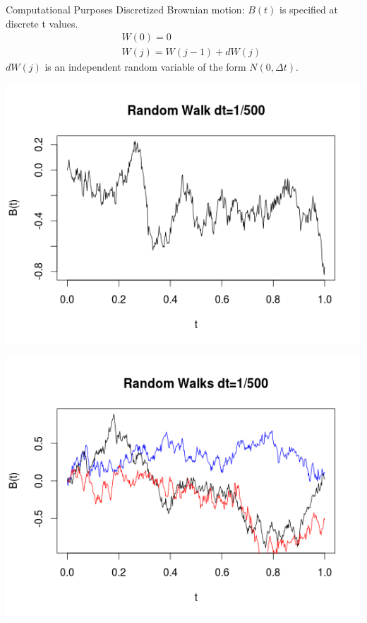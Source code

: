 \begin{frame}{Computational Purposes}
\pause
Discretized Brownian motion: $B(t)$ is specified at discrete t values.
\begin{eqnarray*}
&& W(0)=0\\
&& W(j)=W(j-1)+dW(j)
\end{eqnarray*}
$dW(j)$ is an independent random variable of the form $N(0,\Delta t)$\cite{doi:10.1137/S0036144500378302}.
\end{frame}

\begin{frame}
\begin{center}
\includegraphics[scale=0.5]{r_w_3.png}
\end{center}
\end{frame}

\begin{frame}
\begin{center}
\includegraphics[scale=0.5]{r_w_4.png}
\end{center}
\end{frame}

